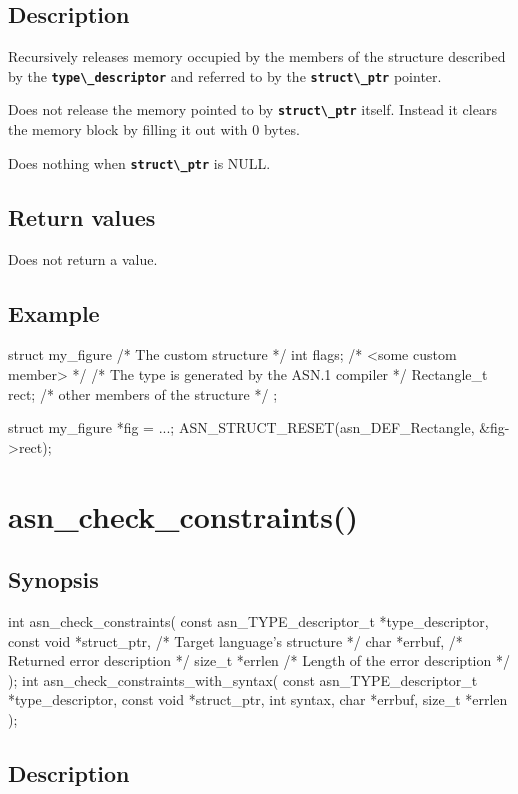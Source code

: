 \documentclass[english,oneside,12pt]{book}
\newcommand{\apisection}[2]{\clearpage\section{\label{#1}#2}}
\newcommand{\code}[1]{\texttt{\textbf{\lstinline{#1}}}}
\begin{document}
\subsection*{Description}

Recursively releases memory occupied by the members of the structure
described by the \code{type\_descriptor} and referred to
by the \code{struct\_ptr} pointer.

Does not release the memory pointed to by \code{struct\_ptr} itself.
Instead it clears the memory block by filling it out with 0 bytes.

Does nothing when \code{struct\_ptr} is NULL.

\subsection*{Return values}
Does not return a value.

\subsection*{Example}

\begin{example}
struct my_figure {       /* The custom structure */
    int flags;           /* <some custom member> */
    /* The type is generated by the ASN.1 compiler */
    Rectangle_t rect;
    /* other members of the structure */
};

struct my_figure *fig = ...;
ASN_STRUCT_RESET(asn_DEF_Rectangle, &fig->rect);
\end{example}

\apisection{sec:asn_check_constraints}{asn\_check\_constraints()}

\subsection*{Synopsis}

\begin{signature}
int asn_check_constraints(
    const asn_TYPE_descriptor_t *type_descriptor,
    const void *struct_ptr, /* Target language's structure */
    char *errbuf,           /* Returned error description */
    size_t *errlen          /* Length of the error description */
);
int asn_check_constraints_with_syntax(
    const asn_TYPE_descriptor_t *type_descriptor,
    const void *struct_ptr,
    int syntax, char *errbuf, size_t *errlen
);
\end{signature}

\subsection*{Description}
\end{document}
